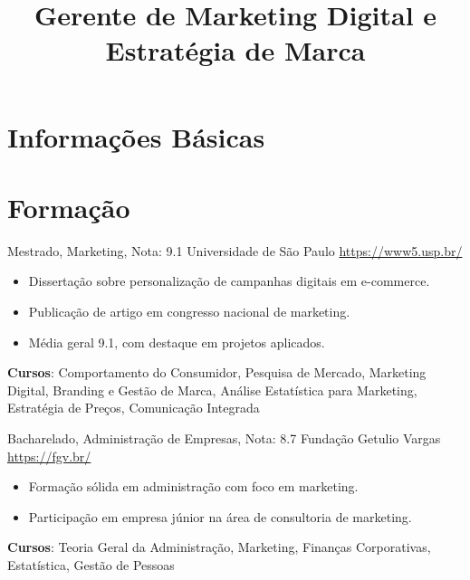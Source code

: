 \documentclass[a4paper, serif, 10pt]{moderncv}
\title{Gerente de Marketing Digital e Estratégia de Marca}
\begin{document}
\maketitle

\section{Informações Básicas}

\section{Formação}

        {Mestrado, Marketing, Nota: 9.1}
        {Universidade de São Paulo}
        {\url{https://www5.usp.br/}}
        {}
        {\begin{itemize}
\item Dissertação sobre personalização de campanhas digitais em e-commerce.
\item Publicação de artigo em congresso nacional de marketing.
\item Média geral 9.1, com destaque em projetos aplicados.
\end{itemize}
\textbf{Cursos}: Comportamento do Consumidor, Pesquisa de Mercado, Marketing Digital, Branding e Gestão de Marca, Análise Estatística para Marketing, Estratégia de Preços, Comunicação Integrada}

        {Bacharelado, Administração de Empresas, Nota: 8.7}
        {Fundação Getulio Vargas}
        {\url{https://fgv.br/}}
        {}
        {\begin{itemize}
\item Formação sólida em administração com foco em marketing.
\item Participação em empresa júnior na área de consultoria de marketing.
\end{itemize}
\textbf{Cursos}: Teoria Geral da Administração, Marketing, Finanças Corporativas, Estatística, Gestão de Pessoas}
\end{document}
